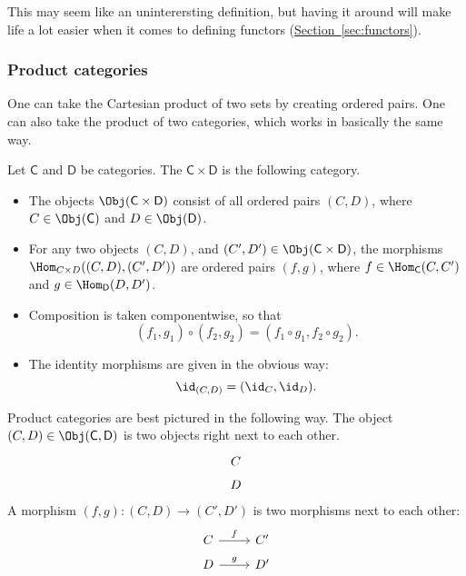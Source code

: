 \documentclass[notes.tex]{subfiles}
\begin{document}
This may seem like an uninterersting definition, but having it around will make life a lot easier when it comes to defining functors (\hyperref[sec:functors]{Section~\ref*{sec:functors}}).


\subsubsection{Product categories}

One can take the Cartesian product of two sets by creating ordered pairs. One can also take the product of two categories, which works in basically the same way.

\begin{definition}
  \label{def:productcategory}
  Let $\mathsf{C}$ and $\mathsf{D}$ be categories. The  $\mathsf{C} \times \mathsf{D}$ is the following category.
  \begin{itemize}
    \item The objects $\Obj(\mathsf{C} \times \mathsf{D})$ consist of all ordered pairs $(C, D)$, where $C \in \Obj(\mathsf{C})$ and $D \in \Obj(\mathsf{D})$.

    \item For any two objects $(C, D)$, and $(C', D') \in \Obj(\mathsf{C} \times \mathsf{D})$,
      the morphisms $\Hom_{C \times D}((C, D), (C', D'))$ are ordered pairs $(f,g)$, where $f \in \Hom_{\mathsf{C}}(C, C')$ and $g \in \Hom_{\mathsf{D}}(D, D')$.

    \item Composition is taken componentwise, so that
      \begin{equation*}
        (f_{1}, g_{1}) \circ (f_{2},g_{2}) = (f_{1} \circ g_{1}, f_{2} \circ g_{2}).
      \end{equation*}

    \item The identity morphisms are given in the obvious way:
      \begin{equation*}
        \id_{(C,D)} = (\id_{C}, \id_{D}).
      \end{equation*}
  \end{itemize}
\end{definition}

Product categories are best pictured in the following way. The object $(C, D) \in \Obj(\mathsf{C}, \mathsf{D})$ is two objects right next to each other.
\begin{equation*}
  \begin{tikzcd}[row sep=tiny]
    C \\
    D
  \end{tikzcd}
\end{equation*}
A morphism $(f, g)\colon (C, D) \to (C', D')$ is two morphisms next to each other:
\begin{equation*}
  \begin{tikzcd}[row sep=tiny]
    C
    \arrow[r, "f"]
    & C'
    \\
    D
    \arrow[r, "g"]
    & D'
  \end{tikzcd}
\end{equation*}
\end{document}
